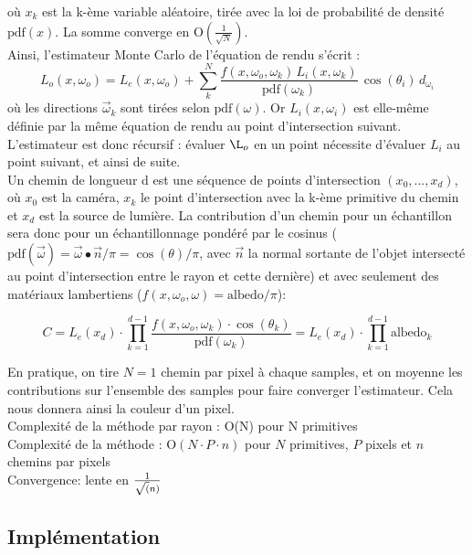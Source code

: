 où $x_k$ est la k-ème variable aléatoire, tirée avec la loi de probabilité de densité $\text{pdf}(x)$. La somme converge en O$\left(\frac{1}{\sqrt{N}}\right)$. \\

Ainsi, l'estimateur Monte Carlo de l'équation de rendu s'écrit :\\


$$L_{o}(x, \omega_o) = L_{e}(x, \omega_o) + \sum_k^N\frac{f(x, \omega_o, \omega_k) \, L_{i}(x, \omega_k)}{\text{pdf}(\omega_k)} \, \cos\left(\theta_i\right) \, d_{\omega_i}$$
où les directions $\vec\omega_k$ sont tirées selon $\text{pdf}(\omega)$. Or $L_{i}(x, \omega_i)$ est elle-même définie par la même équation de rendu au point d'intersection suivant. L'estimateur est donc récursif : évaluer $\L_o$ en un point nécessite d'évaluer $L_i$ au point suivant, et ainsi de suite.\\

Un chemin de longueur d est une séquence de points d'intersection $\left( x_0,...,x_d\right)$, où $x_0$ est la caméra, $x_k$ le point d'intersection avec la k-ème primitive du chemin et $x_d$ est la source de lumière. La contribution d'un chemin pour un échantillon sera donc pour un échantillonnage pondéré par le cosinus ($\text{pdf}(\vec\omega)=\vec\omega\bullet\vec n/\pi=\cos(\theta)/\pi$, avec $\vec n$ la normal sortante de l'objet intersecté au point d'intersection entre le rayon et cette dernière) et avec seulement des matériaux lambertiens ($f(x, \omega_o, \omega)=\text{albedo}/\pi$):

$$
C=L_e(x_d)\cdot\prod^{d-1}_{k=1}\frac{f(x, \omega_o, \omega_k)\cdot\cos(\theta_k)}{\text{pdf}(\omega_k)}=L_e(x_d)\cdot\prod^{d-1}_{k=1}\text{albedo}_k
$$


En pratique, on tire $N=1$ chemin par pixel à chaque samples, et on moyenne les contributions sur l'ensemble des samples pour faire converger l'estimateur. Cela nous donnera ainsi la couleur d'un pixel.\\



Complexité de la méthode par rayon : O(N) pour N primitives\\
Complexité de la méthode : O$(N\cdot P\cdot n)$ pour $N$ primitives, $P$ pixels et $n$ chemins par pixels \\
Convergence: lente en $1\over{\sqrt(n)}$


\subsection{Implémentation}

